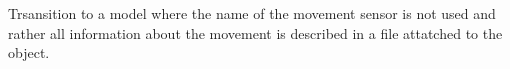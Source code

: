 
\begin{DoxyRefList}
\item[Member \mbox{\hyperlink{class_robot_script_aaaacc0eacd09c68f0e399dfb780c16a3}{Robot\+Script.Get\+Possible\+Movement\+Sensors}} ()]\label{todo__todo000001}%
%
Trsansition to a model where the name of the movement sensor is not used and rather all information about the movement is described in a file attatched to the object. ~\newline
 
\end{DoxyRefList}